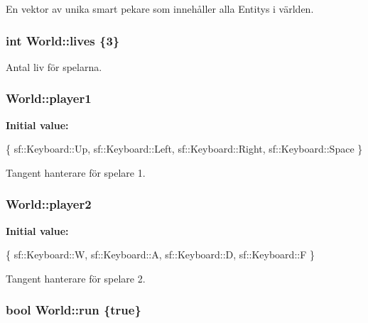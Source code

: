 En vektor av unika smart pekare som innehåller alla Entitys i världen. 

\hypertarget{classWorld_af7d5c3e3405e2efaadf6cd76745440c6}{
\subsubsection[{lives}]{\setlength{\rightskip}{0pt plus 5cm}int World\+::lives \{3\}\hspace{0.3cm}{\ttfamily [private]}}}\label{classWorld_af7d5c3e3405e2efaadf6cd76745440c6}


Antal liv för spelarna. 

\hypertarget{classWorld_a9607cd0034a5a2b9638598c64d03091e}{
\subsubsection[{player1}]{ World\+::player1}}\label{classWorld_a9607cd0034a5a2b9638598c64d03091e}
{\bfseries Initial value\+:}
\begin{DoxyCode}
\{
        sf::Keyboard::Up,
        sf::Keyboard::Left,
        sf::Keyboard::Right,
        sf::Keyboard::Space
    \}
\end{DoxyCode}


Tangent hanterare för spelare 1. 

\hypertarget{classWorld_acbb895c03359b30548afdceeba0903e6}{
\subsubsection[{player2}]{ World\+::player2}}\label{classWorld_acbb895c03359b30548afdceeba0903e6}
{\bfseries Initial value\+:}
\begin{DoxyCode}
\{
        sf::Keyboard::W,
        sf::Keyboard::A,
        sf::Keyboard::D,
        sf::Keyboard::F
    \}
\end{DoxyCode}


Tangent hanterare för spelare 2. 

\hypertarget{classWorld_a3bc8666629d71e77057927b14687407b}{
\subsubsection[{run}]{\setlength{\rightskip}{0pt plus 5cm}bool World\+::run \{true\}}}\label{classWorld_a3bc8666629d71e77057927b14687407b}


